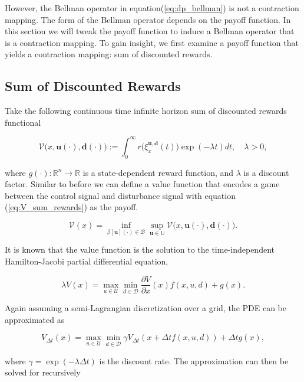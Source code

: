 \documentclass{journal}
\newcommand{\B}{\mathcal{B}}
\newcommand{\D}{\mathcal{D}}
\newcommand{\U}{\mathcal{U}}
\newcommand{\V}{\mathcal{V}}
\newcommand{\RR}{\mathbb{R}}
\newcommand{\UU}{\mathbb{U}}
\newcommand{\bu}{\bm{u}}
\newcommand{\bdelta}{\bm{d}}
\newcommand{\bx}{\xi}
\begin{document}
However, the Bellman operator in equation(\ref{eq:dp_bellman}) is not a contraction mapping. The form of the Bellman operator depends on the payoff function. In this section we will tweak the payoff function to induce a Bellman operator that is a contraction mapping. To gain insight, we first examine a payoff function that yields a contraction mapping: sum of discounted rewards.

\subsection{Sum of Discounted Rewards}

Take the following continuous time infinite horizon sum of discounted rewards functional

\begin{equation}\label{eq:V_sum_rewards}
\mathcal{V}\big(x,\bu(\cdot),\bdelta(\cdot)\big) := \int_{0}^{\infty}r\big(\bx_{x}^{\bu,\bdelta}(t)\big)\exp(-\lambda t) dt,  \quad \lambda >0,
\end{equation}

\noindent where $g(\cdot):\RR^n \rightarrow \RR$ is a state-dependent reward function, and $\lambda$ is a discount factor. Similar to before we can define a value function that encodes a game between the control signal and disturbance signal with equation (\ref{eq:V_sum_rewards}) as the payoff.

\begin{equation}
\V(x)=\inf_{\beta[\bu](\cdot) \in \B} \sup_{\bu \in \UU}\mathcal{V}\big(x,\bu(\cdot),\bdelta(\cdot)\big).
\end{equation}

It is known that the value function is the solution to the time-independent Hamilton-Jacobi partial differential equation,

\begin{equation}
\lambda V(x) = \max_{u\in\U} \min_{ d\in\D} \frac{\partial V}{\partial x}(x) f(x, u, d)+ g(x).
\end{equation}

Again assuming a semi-Lagrangian discretization over a grid, the PDE can be approximated as

\begin{equation}
V_{\Delta t}(x) = \max_{u\in\U} \min_{ d\in\D} \gamma V_{\Delta t}(x + \Delta t f(x, u, d))  + \Delta t g(x),
\end{equation}
 
\noindent where $\gamma=\exp(-\lambda \Delta t)$ is the discount rate. The approximation can then be solved for recursively
\end{document}

